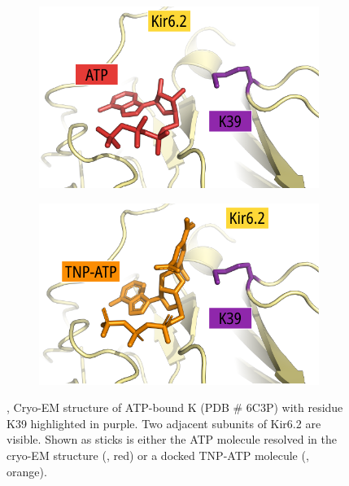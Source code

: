 \begin{figure}[hbtp]
	\centering
	\begin{subfigure}[t]{0.45\textwidth}
		\caption{}\label{ch5fig:k39_clash_atp}
		\centering
		\includegraphics[width=\textwidth]{k39_clash_atp.pdf}
	\end{subfigure}
	\hfill
	\begin{subfigure}[t]{0.45\textwidth}
		\caption{}\label{ch5fig:k39_clash_tnpatp}
		\centering
		\includegraphics[width=\textwidth]{k39_clash_tnpatp.pdf}
	\end{subfigure}
	\caption[K39 is in close proximity to the TNP moiety of bound TNP-ATP]{
	,  Cryo-EM structure of ATP-bound K\ATP{} (PDB \# 6C3P) with residue K39 highlighted in purple.
	Two adjacent subunits of Kir6.2 are visible.
	Shown as sticks is either the ATP molecule resolved in the cryo-EM structure (, red) or a docked TNP-ATP molecule (, orange).
	}\label{ch5fig:k39_3}
\end{figure}

